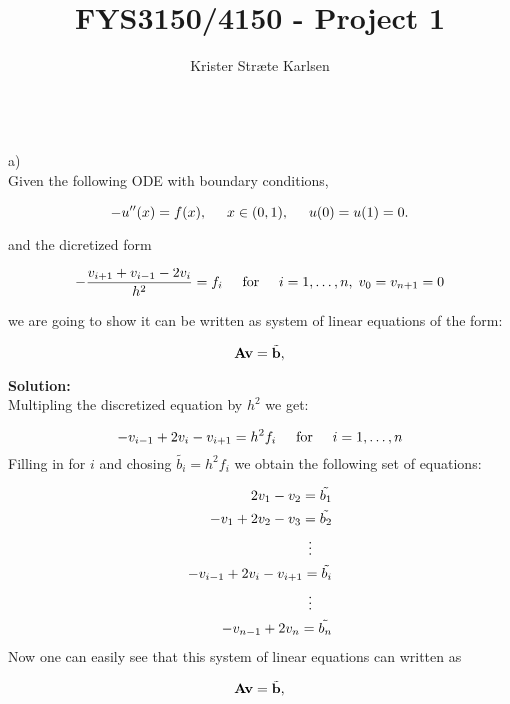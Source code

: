 \documentclass[11pt,a4paper,twoside,reqno]{amsart}
\title{FYS3150/4150 - Project 1}
\author{Krister Stræte Karlsen\\
\\ \texttt{}}
\begin{document}
 
\maketitle
\noindent
a)\\
\noindent
Given the following ODE with boundary conditions, 

\[
-u''(x) = f(x), \hspace{0.5cm} x\in(0,1), \hspace{0.5cm} u(0) = u(1) = 0.
\]

and the dicretized form

\[
   -\frac{v_{i+1}+v_{i-1}-2v_i}{h^2} = f_i  \hspace{0.5cm} \mathrm{for} \hspace{0.5cm} i=1,\dots, n, \hspace{0.1cm} v_0 = v_{n+1} = 0
\]

we are going to show it can be written as system of linear equations of the form: 

\[
   {\bf A}{\bf v} = \tilde{{\bf b}},
\]

\noindent
\textbf{Solution:}\\
Multipling the discretized equation by $h^2$ we get:

\[
   -v_{i-1}+2v_{i}-v_{i+1}=h^2 f_i \hspace{0.5cm} \mathrm{for} \hspace{0.5cm} i=1,\dots, n 
\]
\vspace{0.5cm}
\noindent
Filling in for $i$ and chosing $\tilde{b_i} = h^2 f_i$ we obtain the following set of equations: 

\begin{align*}
	2v_{1}-v_{2}=\tilde{b_1} \\
	-v_{1}+2v_{2}-v_{3}=\tilde{b_2} \\
	\vdots \hspace{0.5cm} \\
	-v_{i-1}+2v_{i}-v_{i+1}=\tilde{b_i} \\
	\vdots \hspace{0.5cm}  \\ 
	-v_{n-1}+2v_{n}=\tilde{b_n} \\
\end{align*}
\noindent
Now one can easily see that this system of linear equations can written as 

\[
   {\bf A}{\bf v} = \tilde{{\bf b}},
\]
\end{document}
